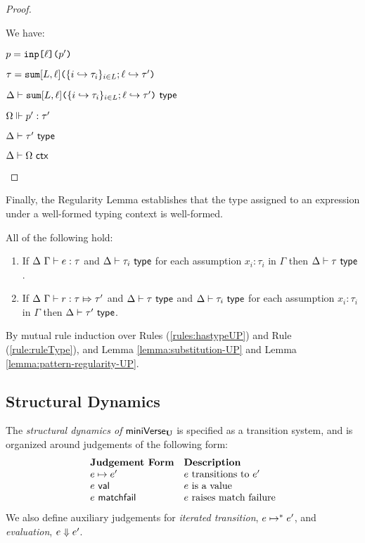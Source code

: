 {{{{\begin{proof}
\begin{byCases}
\item[\text{(\ref{rule:patType-inj})}] We have:
\begin{pfsteps*}
  \item $p=\texttt{inp}\texttt{[}\ell\texttt{](}p'\texttt{)}$ 
  \item $\tau=\texttt{sum}[L, \ell]\texttt{(}\{i \hookrightarrow \tau_{i}\}_{i \in L}; \ell \hookrightarrow \tau'\texttt{)}$ 
  \item $\Delta \vdash \texttt{sum}[L, \ell]\texttt{(}\{i \hookrightarrow \tau_{i}\}_{i \in L}; \ell \hookrightarrow \tau'\texttt{)}~\mathsf{type}$  
  \item $\Omega \Vdash p' : \tau'$  
  \item $\Delta \vdash \tau'~\mathsf{type}$   
  \item $\Delta \vdash \Omega~\mathsf{ctx}$ 
\end{pfsteps*}
\resetpfcounter
\end{byCases}
\end{proof}

Finally, the Regularity Lemma establishes that the type assigned to an expression under a well-formed typing context is well-formed. 
\begin{lemma}[Regularity]\label{lemma:regularity-UP} All of the following hold:
\begin{enumerate}
\item If $\Delta~\Gamma \vdash e : \tau$ and $\Delta \vdash \tau_i~\mathsf{type}$ for each assumption $x_i : \tau_i$ in $\Gamma$ then $\Delta \vdash \tau~\mathsf{type}$.
\item If $\Delta~\Gamma \vdash r : \tau \Mapsto \tau'$ and $\Delta \vdash \tau~\mathsf{type}$ and $\Delta \vdash \tau_i~\mathsf{type}$ for each assumption $x_i : \tau_i$ in $\Gamma$ then $\Delta \vdash \tau'~\mathsf{type}$.
\end{enumerate}
\end{lemma}
\begin{proof-sketch} By mutual rule induction over Rules (\ref{rules:hastypeUP}) and Rule (\ref{rule:ruleType}), and Lemma \ref{lemma:substitution-UP} and Lemma \ref{lemma:pattern-regularity-UP}.
\end{proof-sketch}
\subsection{Structural Dynamics}\label{sec:dynamics-UP}
The \emph{structural dynamics of }$\mathsf{miniVerse}_\textbf{U}$ is specified as a transition system, and is organized around judgements of the following form:
\[\begin{array}{ll}
\textbf{Judgement Form} & \textbf{Description}\\
e \mapsto e' & \text{$e$ transitions to $e'$}\\
e~\mathsf{val} & \text{$e$ is a value}\\
e~\mathsf{matchfail} & \text{$e$ raises match failure}
\end{array}\]
We also define auxiliary judgements for \emph{iterated transition}, $e \mapsto^{*} e'$, and \emph{evaluation}, $e \Downarrow e'$.

}}}}
